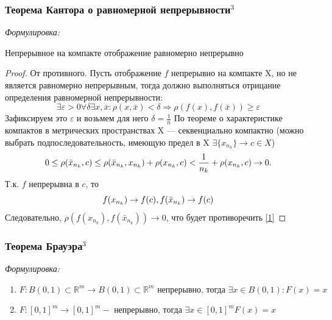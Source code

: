 \documentclass{article}
\begin{document}
\subsubsection{Теорема Кантора о равномерной непрерывности\texorpdfstring{$^3$}{}}

\textit{Формулировка: }
    
Непрерывное на компакте отображение равномерно непрерывно

\begin{proof}
От противного. Пусть отображение $f$ непрерывно на компакте X, но не является равномерно непрерывным, тогда должно выполняться отрицание определения равномерной непрерывности:
\begin{equation} \label{1}
\exists \varepsilon>0 \forall \delta \exists x,\bar{x}: \rho(x, \bar{x}) < \delta \Rightarrow \rho(f(x), f(\bar{x})) \geq \varepsilon
\end{equation}
Зафиксируем это $ \varepsilon$ и возьмем для него $\delta = \frac{1}{n}$
По теореме о характеристике компактов в метрических пространствах X --- секвенциально компактно (можно выбрать подпоследовательность, имеющую предел в X $\exists \{x_{n_k}\} \rightarrow c \in X$)
\begin{equation}
0 \leq \rho(\bar{x}_{n_k}, c) \leq \rho(\bar{x}_{n_k}, x_{n_k}) + \rho(x_{n_k}, c) < \frac{1}{n_k} +\rho(x_{n_k}, c) \rightarrow 0. \notag
\end{equation}
Т.к. $f$ непрерывна в $c$, то
\begin{equation}
f(x_{n_k}) \rightarrow f(c), f(\bar{x}_{n_k}) \rightarrow f(c) \notag
\end{equation}
Следовательно, $\rho(f(x_{n_k}), f(\bar{x}_{n_k})) \rightarrow 0$, что будет противоречить \eqref{1}
\end{proof}

\subsubsection{Теорема Брауэра\texorpdfstring{$^3$}{}}

\textit{Формулировка:}
\begin{enumerate}
\item $F: B(0, 1) \subset \mathbb{R}^m \rightarrow B(0, 1) \subset \mathbb{R}^m \text{ непрерывно, тогда } \exists x \in B(0, 1): F(x) = x$
\item $F: [0, 1]^m \rightarrow [0, 1]^m - \text{ непрерывно, тогда } \exists x \in [0, 1]^m F(x) = x$
\end{enumerate}
\end{document}
